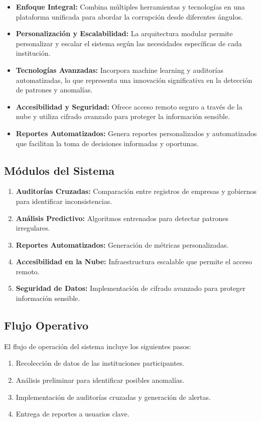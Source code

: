 \documentclass[a4paper,12pt]{article}
\begin{document}
\begin{itemize}
    \item \textbf{Enfoque Integral:} Combina múltiples herramientas y tecnologías en una plataforma unificada para abordar la corrupción desde diferentes ángulos.
    \item \textbf{Personalización y Escalabilidad:} La arquitectura modular permite personalizar y escalar el sistema según las necesidades específicas de cada institución.
    \item \textbf{Tecnologías Avanzadas:} Incorpora machine learning y auditorías automatizadas, lo que representa una innovación significativa en la detección de patrones y anomalías.
    \item \textbf{Accesibilidad y Seguridad:} Ofrece acceso remoto seguro a través de la nube y utiliza cifrado avanzado para proteger la información sensible.
    \item \textbf{Reportes Automatizados:} Genera reportes personalizados y automatizados que facilitan la toma de decisiones informadas y oportunas.
\end{itemize}

\subsection{Módulos del Sistema}
\begin{enumerate}
    \item \textbf{Auditorías Cruzadas:} Comparación entre registros de empresas y gobiernos para identificar inconsistencias.
    \item \textbf{Análisis Predictivo:} Algoritmos entrenados para detectar patrones irregulares.
    \item \textbf{Reportes Automatizados:} Generación de métricas personalizadas.
    \item \textbf{Accesibilidad en la Nube:} Infraestructura escalable que permite el acceso remoto.
    \item \textbf{Seguridad de Datos:} Implementación de cifrado avanzado para proteger información sensible.
\end{enumerate}

\subsection{Flujo Operativo}
El flujo de operación del sistema incluye los siguientes pasos:
\begin{enumerate}
    \item Recolección de datos de las instituciones participantes.
    \item Análisis preliminar para identificar posibles anomalías.
    \item Implementación de auditorías cruzadas y generación de alertas.
    \item Entrega de reportes a usuarios clave.
\end{enumerate}
\end{document}
